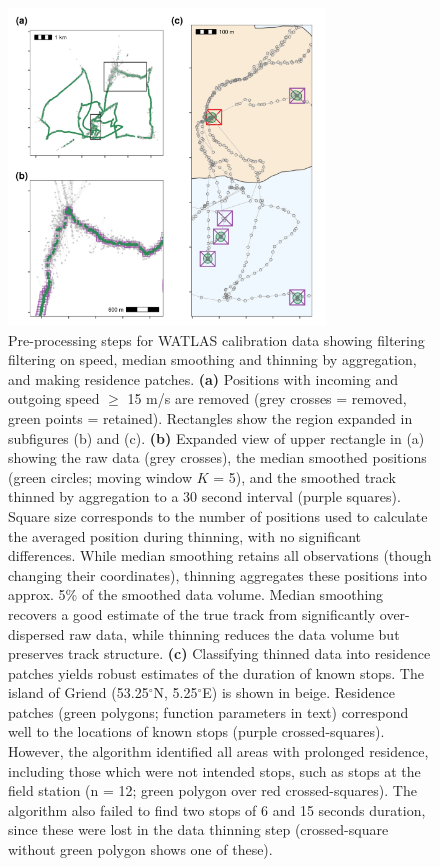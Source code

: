 \documentclass[10pt,paper=a4,headings=standardclasses
]{scrartcl}
\begin{document}
\begin{figure}[h!]
    \centering
    \includegraphics[width=0.75\textwidth]{figures/fig_06_calib_residence_patch.png}
    \caption{Pre-processing steps for WATLAS calibration data showing filtering filtering on speed, median smoothing and thinning by aggregation, and making residence patches.
    \textbf{(a)} Positions with incoming and outgoing speed $\geq$ 15 m/s are removed (grey crosses = removed, green points = retained).
    Rectangles show the region expanded in subfigures (b) and (c).
    \textbf{(b)} Expanded view of upper rectangle in (a) showing the raw data (grey crosses), the median smoothed positions (green circles; moving window $K$ = 5), and the smoothed track thinned by aggregation to a 30 second interval (purple squares).
    Square size corresponds to the number of positions used to calculate the averaged position during thinning, with no significant differences.
    While median smoothing retains all observations (though changing their coordinates), thinning aggregates these positions into approx. 5\% of the smoothed data volume.
    Median smoothing recovers a good estimate of the true track from significantly over-dispersed raw data, while thinning reduces the data volume but preserves track structure.
    \textbf{(c)} Classifying thinned data into residence patches yields robust estimates of the duration of known stops. The island of Griend (53.25$^{\circ}$N, 5.25$^{\circ}$E) is shown in beige.
    Residence patches (green polygons; function parameters in text) correspond well to the locations of known stops (purple crossed-squares).
    However, the algorithm identified all areas with prolonged residence, including those which were not intended stops, such as stops at the field station (n = 12; green polygon over red crossed-squares).
    The algorithm also failed to find two stops of 6 and 15 seconds duration, since these were lost in the data thinning step (crossed-square without green polygon shows one of these).}
    \label{fig:figure_calibration}
\end{figure}
\end{document}
